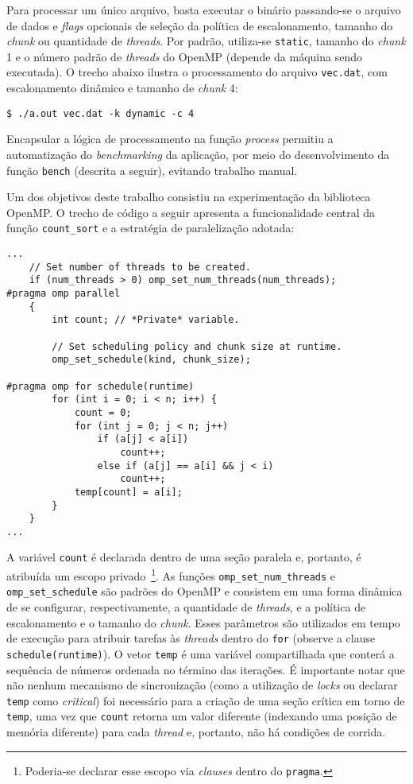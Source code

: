 \documentclass[12pt,a4paper]{article}
\begin{document}
Para processar um único arquivo, basta executar o binário passando-se o arquivo
de dados e \textit{flags} opcionais de seleção da política de escalonamento,
tamanho do \textit{chunk} ou quantidade de \textit{threads}. Por padrão,
utiliza-se \texttt{static}, tamanho do \textit{chunk} 1 e o número padrão de
\textit{threads} do OpenMP (depende da máquina sendo executada). O trecho
abaixo ilustra o processamento do arquivo \texttt{vec.dat}, com escalonamento
dinâmico e tamanho de \textit{chunk} 4:

\begin{verbatim}
$ ./a.out vec.dat -k dynamic -c 4
\end{verbatim}

Encapsular a lógica de processamento na função \textit{process} permitiu a
automatização do \textit{benchmarking} da aplicação, por meio do desenvolvimento
da função \texttt{bench} (descrita a seguir), evitando trabalho manual.

Um dos objetivos deste trabalho consistiu na experimentação da biblioteca
OpenMP\@. O trecho de código a seguir apresenta a funcionalidade central da
função \texttt{count\_sort} e a estratégia de paralelização adotada:

\begin{verbatim}
...
    // Set number of threads to be created.
    if (num_threads > 0) omp_set_num_threads(num_threads);
#pragma omp parallel
    {
        int count; // *Private* variable.

        // Set scheduling policy and chunk size at runtime.
        omp_set_schedule(kind, chunk_size);

#pragma omp for schedule(runtime)
        for (int i = 0; i < n; i++) {
            count = 0;
            for (int j = 0; j < n; j++)
                if (a[j] < a[i])
                    count++;
                else if (a[j] == a[i] && j < i)
                    count++;
            temp[count] = a[i];
        }
    }
...
\end{verbatim}

A variável \texttt{count} é declarada dentro de uma seção paralela e, portanto,
é atribuída um escopo privado~\footnote{Poderia-se declarar esse escopo via
\textit{clauses} dentro do \texttt{pragma}.}. As funções
\texttt{omp\_set\_num\_threads} e \texttt{omp\_set\_schedule} são padrões do
OpenMP e consistem em uma forma dinâmica de se configurar, respectivamente, a
quantidade de \textit{threads}, e a política de escalonamento e o tamanho do
\textit{chunk}. Esses parâmetros são utilizados em tempo de execução para
atribuir tarefas às \textit{threads} dentro do \texttt{for} (observe a clause
\texttt{schedule(runtime)}). O vetor \texttt{temp} é uma variável compartilhada
que conterá a sequência de números ordenada no término das iterações. É
importante notar que não nenhum mecanismo de sincronização (como a utilização de
\textit{locks} ou declarar \texttt{temp} como \emph{critical}) foi necessário
para a criação de uma seção crítica em torno de \texttt{temp}, uma vez que
\texttt{count} retorna um valor diferente (indexando uma posição de memória
diferente) para cada \textit{thread} e, portanto, não há condições de corrida.
\end{document}
